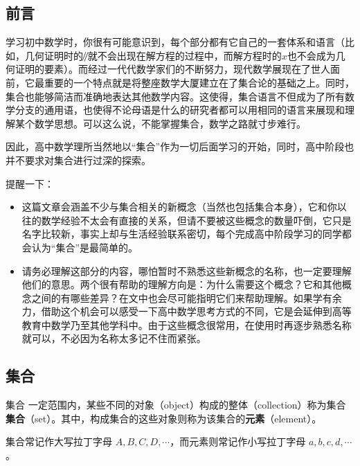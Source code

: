 
\begin{issues}
\issueDraft
\end{issues}

\subsection{前言}

学习初中数学时，你很有可能意识到，每个部分都有它自己的一套体系和语言（比如，几何证明时的$\mathbin{\!/\mkern-5mu/\!}$就不会出现在解方程的过程中，而解方程时的$x$也不会成为几何证明的要素）。而经过一代代数学家们的不断努力，现代数学展现在了世人面前，它最重要的一个特点就是将整座数学大厦建立在了集合论的基础之上。同时，集合也能够简洁而准确地表达其他数学内容。这使得，集合语言不但成为了所有数学分支的通用语，也使得不论母语是什么的研究者都可以用相同的语言来展现和理解某个数学思想。可以这么说，不能掌握集合，数学之路就寸步难行。

因此，高中数学理所当然地以“集合”作为一切后面学习的开始，同时，高中阶段也并不要求对集合进行过深的探索。

提醒一下：
\begin{itemize}
\item 这篇文章会涵盖不少与集合相关的新概念（当然也包括集合本身），它和你以往的数学经验不太会有直接的关系，但请不要被这些概念的数量吓倒，它只是名字比较新，事实上却与生活经验联系密切，每个完成高中阶段学习的同学都会认为“集合”是最简单的。
\item 请务必理解这部分的内容，哪怕暂时不熟悉这些新概念的名称，也一定要理解他们的意思。两个很有帮助的理解方向是：为什么需要这个概念？它和其他概念之间的有哪些差异？在文中也会尽可能指明它们来帮助理解。如果学有余力，借助这个机会可以感受一下高中数学思考方式的不同，它是会延伸到高等教育中数学乃至其他学科中。由于这些概念很常用，在使用时再逐步熟悉名称就可以，不必因为名称太多记不住而紧张。
\end{itemize}

\subsection{集合}

\begin{definition}{集合}
一定范围内，某些不同的对象（object）构成的整体（collection）称为集合\textbf{集合}（set）。其中，构成集合的这些对象则称为该集合的\textbf{元素}（element）。

集合常记作大写拉丁字母 $A,B,C,D,\cdots$，而元素则常记作小写拉丁字母 $a,b,c,d,\cdots$ 。

\end{definition}


